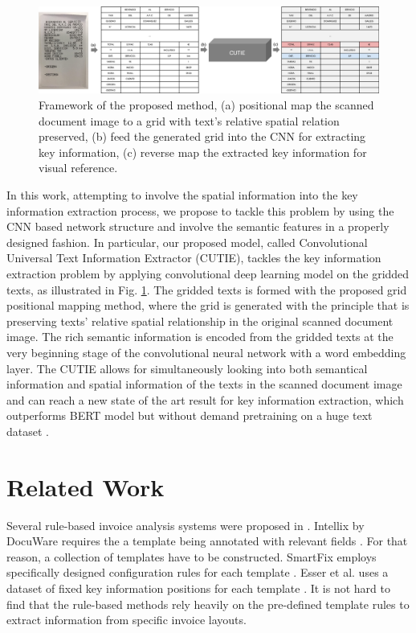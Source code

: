\documentclass[10pt,twocolumn,letterpaper]{article}
\begin{document}
\begin{figure}
\begin{center}
\includegraphics[width=0.99\linewidth]{Model.png}
\end{center}
   \caption{Framework of the proposed method, (a) positional map the scanned document image to a grid with text's relative spatial relation preserved, (b) feed the generated grid into the CNN for extracting key information, (c) reverse map the extracted key information for visual reference.}
\label{fig:cutie}
\end{figure}
In this work, attempting to involve the spatial information into the key information extraction process, we propose to tackle this problem by using the CNN based network structure and involve the semantic features in a properly designed fashion. In particular, our proposed model, called Convolutional Universal Text Information Extractor (CUTIE), tackles the key information extraction problem by applying convolutional deep learning model on the gridded texts, as illustrated in Fig. \ref{fig:cutie}. The gridded texts is formed with the proposed grid positional mapping method, where the grid is generated with the principle that is preserving texts’ relative spatial relationship in the original scanned document image. The rich semantic information is encoded from the gridded texts at the very beginning stage of the convolutional neural network with a word embedding layer. The CUTIE allows for simultaneously looking into both semantical information and spatial information of the texts in the scanned document image and can reach a new state of the art result for key information extraction, which outperforms BERT model but without demand pretraining on a huge text dataset \cite{bert,transformer}.


\section{Related Work}
Several rule-based invoice analysis systems were proposed in \cite{3,5,7}. Intellix by DocuWare requires the a template being annotated with relevant fields \cite{3}. For that reason, a collection of templates have to be constructed. SmartFix employs specifically designed configuration rules for each template \cite{5}. Esser et al. uses a dataset of fixed key information positions for each template \cite{7}. It is not hard to find that the rule-based methods rely heavily on the pre-defined template rules to extract information from specific invoice layouts.
\end{document}
